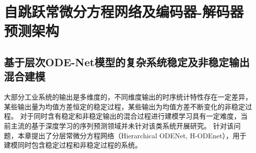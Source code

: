 

\section{自跳跃常微分方程网络及编码器-解码器预测架构}
\subsection{基于层次ODE-Net模型的复杂系统稳定及非稳定输出混合建模}
\label{sec:h-ode}
大部分工业系统的输出是多维度的，不同维度输出的时序统计特性存在一定差异，某些输出量为均值方差恒定的稳定过程，某些输出为均值方差不断变化的非稳定过程。
对于同时含有稳定和非稳定输出的混合过程进行建模学习具有一定难度，当前主流的基于深度学习的序列预测领域并未针对该类系统开展研究。
针对该问题，本章提出了分层常微分方程网络（Hierarchical ODENet, H-ODEnet），用于建模同时包含稳定过程和非稳定过程的系统。

